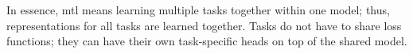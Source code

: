 In essence, \gls{mtl} means learning multiple tasks together within one model; thus, representations for all tasks are learned together. Tasks do not have to share loss functions; they can have their own task-specific heads on top of the shared model.

